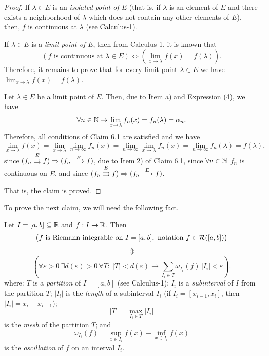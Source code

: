 \begin{proof}
If $\lambda\in E$ is an \emph{isolated point of $E$} (that is, if $\lambda$ is an element of $E$ and there exists a neighborhood of $\lambda$ which does not contain any other elements of $E$), then, $f$ is continuous at $\lambda$ (see Calculus-1).

If $\lambda\in E$ is a \emph{limit point of $E$}, then from Calculus-1, it is known that
\[
(f\text{ is continuous at }\lambda\in E)
\Longleftrightarrow
\left(\lim_{x\to\lambda}f(x)=f(\lambda)\right).
\tag{4}\label{eq:6:4:1}
\]
Therefore, it remains to prove that for every limit point $\lambda\in E$ we have $\lim_{x\to\lambda}f(x)=f(\lambda)$.

Let $\lambda\in E$ be a limit point of $E$.
Then, due to \hyperref[item:claim:6.2:a]{Item a)} and \hyperref[eq:6:4:1]{Expression (4)}, we have
\[
\forall n\in\mathbb{N}\to \lim_{x\to\lambda}f_n(x)=f_n(\lambda)=\alpha_n.
\]
Therefore, all conditions of \hyperref[claim:6.1]{Claim 6.1} are satisfied and we have
\[
\lim_{x\to\lambda}f(x)
=
\lim_{x\to\lambda}\lim_{n\to\infty}f_n(x)
=
\lim_{n\to\infty}\lim_{x\to\lambda}f_n(x)
=
\lim_{n\to\infty}f_n(\lambda)
=
f(\lambda),
\]
since $(f_n\mathrel{\overset{E}{\rightrightarrows}}f)\Rightarrow(f_n\mathrel{\overset{E}{\longrightarrow}}f)$, due to \hyperref[item:claim:6.1:2]{Item 2)} of \hyperref[claim:6.1]{Claim 6.1}, since $\forall n\in\mathbb{N}$ $f_n$ is continuous on $E$, and since $(f_n\mathrel{\overset{E}{\rightrightarrows}}f)\Rightarrow(f_n\mathrel{\overset{E}{\longrightarrow}}f)$.

That is, the claim is proved.
\end{proof}

To prove the next claim, we will need the following fact.

\begin{claim}\label{claim:6.3}
Let $I=[a,b]\subseteq\mathbb{R}$ and $f:I\to\mathbb{R}$.
Then
\[
\bigl(f\text{ is Riemann integrable on }I=[a,b],\ \text{notation }f\in\Riem([a,b])\bigr)
\]
\[
\Updownarrow
\]
\[
\left(\forall\varepsilon>0\ \exists d(\varepsilon)>0\ \forall T:\ |T|<d(\varepsilon)
\to \sum_{I_i\in T}\omega_{I_i}(f)\,|I_i|<\varepsilon\right).
\tag{5}\label{eq:6:5:1}
\]
where: $T$ is a \emph{partition} of $I=[a,b]$ (see Calculus-1);
$I_i$ is a \emph{subinterval} of $I$ from the partition $T$;
$|I_i|$ is the \emph{length} of a subinterval $I_i$ (if $I_i=[x_{i-1},x_i]$, then $|I_i|=x_i-x_{i-1}$);
\[
|T|=\max_{I_i\in T}|I_i|
\]
is the \emph{mesh} of the partition $T$; and
\[
\omega_{I_i}(f)=\sup_{x\in I_i}f(x)-\inf_{x\in I_i}f(x)
\]
is the \emph{oscillation} of $f$ on an interval $I_i$.
\end{claim}

